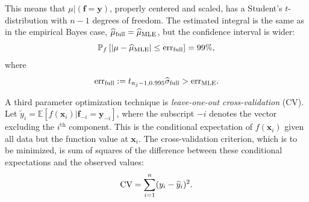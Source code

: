 \documentclass{iitthesis}          %
\newcommand{\bm}[1]{\boldsymbol{#1}}
\newcommand{\Ex}{\mathbb{E}}
\newcommand{\vf}{\bm{f}}
\newcommand{\vx}{\bm{x}}
\newcommand{\vy}{\bm{y}}
\newcommand{\hmu}{\widehat{\mu}}
\newcommand{\hsigma}{\widehat{\sigma}}
\newcommand{\MLE}{\textup{MLE}}
\newcommand{\err}{\textup{err}}
\begin{document}
This means that $\mu \vert (\vf = \vy )$, properly centered and scaled, has a Student's $t$-distribution with $n-1$ degrees of freedom.   The estimated integral is the same as in the empirical Bayes case, $\hmu_{\textup{full}} = \hmu_{\MLE}$, but the confidence interval is wider:
\begin{equation*}
\mathbb{P}_f \left[
|\mu-\hmu_\MLE| \leq \err_{\textup{full}} \right]  = 99\%,
\end{equation*}
where
\begin{equation*}
\err_{\textup{full}} 
:= t_{n_j-1,0.995} \hsigma_{\textup{full}} > \err_\MLE .
\end{equation*}


























 \label{sec:GCV}
A third parameter optimization technique is \emph{leave-one-out cross-validation} (CV).  Let $\widetilde{y}_i = \Ex[f(\vx_i ) | \vf_{-i} = \vy_{-i}]$, where the subscript $-i$ denotes the vector excluding the $i^{\text{th}}$ component.  This is the conditional expectation of $f(\vx_i )$ given all data but the function value at $\vx_i$.  The cross-validation criterion, which is to be minimized, is sum of squares of the difference between these conditional expectations and the observed values:
\begin{equation} \label{FJH:eq:CVA}
\textup{CV} = \sum_{i=1}^n (y_i - \widetilde{y}_i)^2.
\end{equation}
\end{document}
